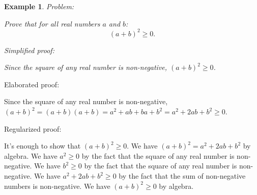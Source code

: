 \documentclass{article}
\newtheorem{example}{Example}
\begin{document}



\begin{example}
Problem:
\begin{tcolorbox}[colback=yellow!10, width=\linewidth]
Prove that for all real numbers $a$ and $b$:
    $$(a+b)^2 \geq 0.$$
\end{tcolorbox}

Simplified proof:
\begin{tcolorbox}[colback=blue!10, width=\linewidth]
Since the square of any real number is non-negative, $(a+b)^2 \ge 0$.
\end{tcolorbox}
\end{example}

Elaborated proof:
\begin{tcolorbox}[colback=green!10, width=\linewidth]
Since the square of any real number is non-negative, $(a+b)^2 = (a+b)(a+b) = a^2 + ab + ba + b^2 = a^2 + 2ab + b^2 \ge 0$.
\end{tcolorbox}

Regularized proof:
\begin{tcolorbox}[colback=red!10, width=\linewidth]
It's enough to show that $(a+b)^2 \geq 0$. We have $(a+b)^2 = a^2 + 2ab + b^2$ by algebra. We have $a^2 \ge 0$ by the fact that the square of any real number is non-negative. We have $b^2 \ge 0$ by the fact that the square of any real number is non-negative. We have $a^2 + 2ab + b^2 \ge 0$ by the fact that the sum of non-negative numbers is non-negative. We have $(a+b)^2 \geq 0$ by algebra.
\end{tcolorbox}
\end{document}
